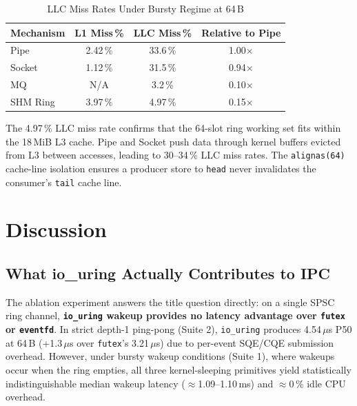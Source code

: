 \documentclass[10pt,conference]{IEEEtran}
\begin{document}
\begin{table}[H]
  \centering
  \caption{LLC Miss Rates Under Bursty Regime at 64\,B}
  \label{tab:cache}
  \small
  \begin{tabular}{@{}lccc@{}}
    \toprule
    \textbf{Mechanism} & \textbf{L1 Miss\,\%} & \textbf{LLC Miss\,\%} & \textbf{Relative to Pipe} \\
    \midrule
    Pipe      & 2.42\,\% & 33.6\,\% & 1.00$\times$ \\
    Socket    & 1.12\,\% & 31.5\,\% & 0.94$\times$ \\
    MQ        & N/A      & 3.2\,\%  & 0.10$\times$ \\
    SHM Ring  & 3.97\,\% & 4.97\,\% & 0.15$\times$ \\
    \bottomrule
  \end{tabular}
\end{table}

The 4.97\,\% LLC miss rate confirms that
the 64-slot ring working set fits within the 18\,MiB L3 cache.  Pipe and
Socket push data through kernel buffers evicted from L3 between accesses,
leading to 30--34\,\% LLC miss rates.  The \texttt{alignas(64)} cache-line
isolation ensures a producer store to \texttt{head} never invalidates the
consumer's \texttt{tail} cache line.

\section{Discussion}
\label{sec:discussion}

\subsection{What io\_uring Actually Contributes to IPC}

The ablation experiment answers the title question directly: on a single SPSC
ring channel, \textbf{\texttt{io\_uring} wakeup provides no latency advantage
over \texttt{futex} or \texttt{eventfd}}.  In strict depth-1 ping-pong (Suite 2),
\texttt{io\_uring} produces 4.54\,$\mu$s P50 at 64\,B (+1.3\,$\mu$s over \texttt{futex}'s
3.21\,$\mu$s) due to per-event SQE/CQE submission overhead.  However, under bursty
wakeup conditions (Suite 1), where wakeups occur when the ring empties, all three
kernel-sleeping primitives yield statistically indistinguishable median wakeup
latency ($\approx$1.09--1.10\,ms) and $\approx$0\,\% idle CPU overhead.
\end{document}
